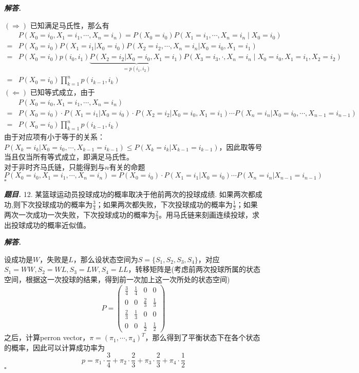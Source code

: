 \documentclass[10pt, a4paper, oneside]{ctexart}
\newenvironment{problem}{\begin{framed}\par\noindent\textbf{\textit{题目. }}}{\end{framed}\par}
\newenvironment{solution}{%
  \par\noindent\textbf{\textit{解答. }}\ignorespaces
}{%
  \hfill\ensuremath{\square}\par %
}
\begin{document}
\begin{solution}
$(\Rightarrow)$ 已知满足马氏性，那么有
\begin{align*}
&P\left( {{X}_{0} = {i}_{0},{X}_{1} = {i}_{1},\cdots ,{X}_{n} ={i}_{n}}\right)=P(X_0=i_0)P(X_1=i_1,\cdots,X_n=i_n\mid X_0=i_0)\\
=&P(X_0=i_0)P(X_1=i_1|X_0=i_0)P(X_2=i_2,\cdots,X_n=i_n|X_0=i_0,X_1=i_1)\\
=&P(X_0=i_0)p(i_0,i_1)\underbrace{P(X_2=i_2|X_0=i_0,X_1=i_1)}_{=p(i_1,i_2)}P(X_3=i_3,\cdot,X_n=i_n\mid X_0=i_0,X_1=i_1,X_2=i_2)\\
=&P\left( {{X}_{0} = {i}_{0}}\right) \mathop{\prod }\limits_{{k = 1}}^{n}p\left( {{i}_{k - 1},{i}_{k}}\right) 
\end{align*}
$(\Leftarrow)$ 已知等式成立，由于
\begin{align*}
    &P\left( {{X}_{0} = {i}_{0},{X}_{1} = {i}_{1},\cdots ,{X}_{n} = {i}_{n}}\right)\\
    =&P(X_0=i_0)\cdot P(X_1=i_1|X_0=i_0)\cdot P(X_2=i_2|X_0=i_0,X_1=i_1)\cdots P(X_n=i_n|X_0=i_0,\cdots,X_{n-1}=i_{n-1})\\
    =&P\left( {{X}_{0} = {i}_{0}}\right) \mathop{\prod }\limits_{{k = 1}}^{n}p\left( {{i}_{k - 1},{i}_{k}}\right)
\end{align*}
由于对应项有小于等于的关系：$P(X_k=i_k|X_0=i_0,\cdots,X_{k-1}=i_{k-1})\leq P(X_k=i_k|X_{k-1}=i_{k-1})$，因此取等号当且仅当所有等式成立，即满足马氏性。\\
对于非时齐马氏链，只能得到与$n$有关的命题
$$P\left( {{X}_{0} = {i}_{0},{X}_{1} = {i}_{1},\cdots ,{X}_{n} = {i}_{n}}\right)=P(X_0=i_0)\cdot P(X_1=i_1|X_0=i_0)\cdots P(X_n=i_n|X_{n-1}=i_{n-1})$$
\end{solution}

\begin{problem}
12. 某篮球运动员投球成功的概率取决于他前两次的投球成绩. 如果两次都成功,则下次投球成功的概率为$\frac{3}{4}$；如果两次都失败，下次投球成功的概率为$\frac{1}{2}$；如果两次一次成功一次失败，下次投球成功的概率为$\frac{2}{3}$。用马氏链来刻画连续投球，求出投球成功的概率近似值。
\end{problem}
\begin{solution}
设成功是$W$，失败是$L$，那么设状态空间为$S=\{S_1,S_2,S_3,S_4\}$，对应$S_1=WW,S_2=WL,S_3=LW,S_4=LL$，转移矩阵是(考虑前两次投球所属的状态空间，根据这一次投球的结果，得到前一次加上这一次所处的状态空间)
$$P=\begin{pmatrix}
    \frac{3}{4}&\frac{1}{4}&0&0\\0&0&\frac{2}{3}&\frac{1}{3}\\ \frac{2}{3}&\frac{1}{3}&0&0\\ 0&0&\frac{1}{2}&\frac{1}{2}
\end{pmatrix}$$
之后，计算perron vector，$\pi=(\pi_1,\cdots,\pi_4)^T$，那么得到了平衡状态下在各个状态的概率，因此可以计算成功率为
$$p=\pi_1\cdot \frac{3}{4}+\pi_2\cdot \frac{2}{3}+\pi_3\cdot \frac{2}{3}+\pi_4\cdot \frac{1}{2}$$
\end{solution}
\end{document}
